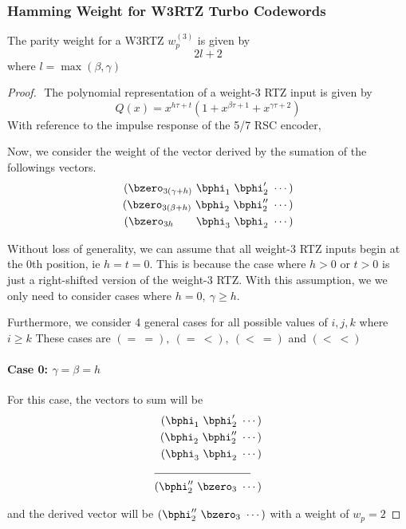 \subsubsection{Hamming Weight for W3RTZ Turbo Codewords }
The parity weight for a W3RTZ  $w^{(3)}_{p}$ is given by
\begin{equation}
2l+2
\label{RTZInputs-2}
\end{equation}
where $l=\max(\beta,\gamma)$
\begin{proof}
$ $\newline
The polynomial representation of a weight-$3$ RTZ input is given by $$Q(x) =x^{h\tau+t}(1+x^{\beta \tau +1}+x^{\gamma \tau +2})$$
With reference to the impulse response of the 5/7  RSC encoder, 



Now, we consider the weight of the vector derived by the sumation of the followings vectors.
\begin{eqnarray*}
(\bzero_{3(\gamma+h)}~\bphi_1~\bphi'_2~\cdots)\cr
(\bzero_{3(\beta+h)}~\bphi_2~\bphi''_2~\cdots)\cr
(\bzero_{3 h}~~~~~~\bphi_3~\bphi_2~\cdots)
\end{eqnarray*}

Without loss of generality, we can assume that all weight-$3$ RTZ inputs begin at the $0$th position, ie $h=t=0$. This is because the case where $h>0$ or $t>0$ is just a right-shifted version of the weight-$3$ RTZ. With this assumption, we we only need to consider cases where $h= 0,~\gamma \geq h$.

Furthermore, we consider 4 general cases for all possible values of $i,j,k$ where $i \geq k$ These cases are $(=~=),~(=~<),~(<~=)$ and $(<~<)$
\paragraph{Case 0: $\gamma=\beta=h$ \newline}

 For this case, the vectors to sum will be 
 \begin{align*}
(\bphi_1~\bphi'_2~\cdots)\\
(\bphi_2~\bphi''_2~\cdots)\\
(\bphi_3~\bphi_2~\cdots)\\
\cline{1-2}
(\bphi''_2~\bzero_{3}~\cdots)
\end{align*}
 
and  the derived vector will be $(\bphi''_2~\bzero_{3}~\cdots)$ with a weight of $w_p=2$
 

\end{proof}
